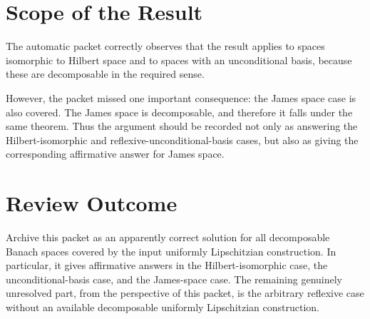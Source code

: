 \documentclass[11pt]{article}
\begin{document}
\section*{Scope of the Result}

The automatic packet correctly observes that the result applies to spaces
isomorphic to Hilbert space and to spaces with an unconditional basis, because
these are decomposable in the required sense.

However, the packet missed one important consequence: the James space case is
also covered. The James space is decomposable, and therefore it falls under the
same theorem. Thus the argument should be recorded not only as answering the
Hilbert-isomorphic and reflexive-unconditional-basis cases, but also as giving
the corresponding affirmative answer for James space.

\section*{Review Outcome}

Archive this packet as an apparently correct solution for all decomposable
Banach spaces covered by the input uniformly Lipschitzian construction. In
particular, it gives affirmative answers in the Hilbert-isomorphic case, the
unconditional-basis case, and the James-space case. The remaining genuinely
unresolved part, from the perspective of this packet, is the arbitrary reflexive
case without an available decomposable uniformly Lipschitzian construction.
\end{document}
